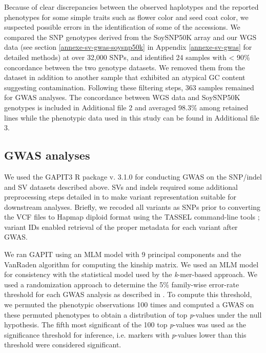 Because of clear discrepancies between the observed haplotypes and the
reported phenotypes for some simple traits such as flower color and seed coat
color, we suspected possible errors in the identification of some of the
accessions. We compared the SNP genotypes derived from the SoySNP50K array
and our WGS data (see section \ref{annexe-sv-gwas-soysnp50k} in Appendix
\ref{annexe-sv-gwas} for detailed methods) at over 32,000 SNPs, and
identified 24 samples with < 90\% concordance between the two genotype
datasets. We removed them from the dataset in addition to another
sample that exhibited an atypical GC content suggesting contamination.
Following these filtering steps, 363 samples remained for GWAS analyses. The
concordance between WGS data and SoySNP50K genotypes is included in
Additional file 2 and averaged 98.3\% among retained lines while the
phenotypic data used in this study can be found in Additional file 3.

\subsection{GWAS analyses}
\label{sv-gwas-gwas-methods}

We used the GAPIT3 R package v. 3.1.0 \citep{wang2021} for conducting GWAS on
the SNP/indel and SV datasets described above. SVs and indels required some additional
preprocessing steps detailed in \cite{lemay2022gwas} to make variant
representation suitable for downstream analyses. Briefly, we recoded all
variants as SNPs prior to converting the VCF files to Hapmap diploid format
using the TASSEL command-line tools \citep{bradbury2007}; variant IDs enabled
retrieval of the proper metadata for each variant after GWAS.

We ran GAPIT using an MLM model with 9 principal components and the VanRaden
algorithm for computing the kinship matrix. We used an MLM model for
consistency with the statistical model used by the \textit{k}-mer-based
approach.  We used a randomization approach to determine the 5\% family-wise
error-rate threshold for each GWAS analysis as described in \cite{voichek2020}.
To compute this threshold, we permuted the phenotypic observations 100 times
and computed a GWAS on these permuted phenotypes to obtain a distribution of
top \emph{p}-values under the null hypothesis. The fifth most significant of
the 100 top \emph{p}-values was used as the significance threshold for
inference, i.e. markers with \emph{p}-values lower than this threshold were
considered significant.

